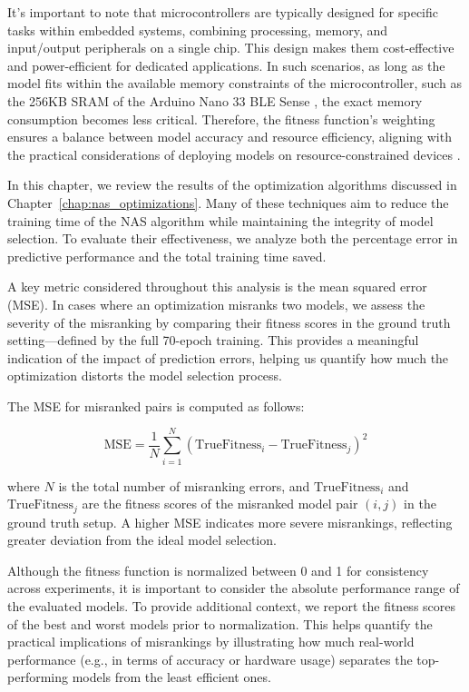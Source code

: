 It's important to note that microcontrollers are typically designed for specific tasks within embedded systems, combining processing, memory, and input/output peripherals on a single chip. This design makes them cost-effective and power-efficient for dedicated applications. In such scenarios, as long as the model fits within the available memory constraints of the microcontroller, such as the 256KB SRAM of the Arduino Nano 33 BLE Sense , the exact memory consumption becomes less critical. Therefore, the fitness function's weighting ensures a balance between model accuracy and resource efficiency, aligning with the practical considerations of deploying models on resource-constrained devices \cite{arduino_nano33ble}.

In this chapter, we review the results of the optimization algorithms discussed in Chapter~\ref{chap:nas_optimizations}. Many of these techniques aim to reduce the training time of the NAS algorithm while maintaining the integrity of model selection. To evaluate their effectiveness, we analyze both the percentage error in predictive performance and the total training time saved.

A key metric considered throughout this analysis is the mean squared error (MSE). In cases where an optimization misranks two models, we assess the severity of the misranking by comparing their fitness scores in the ground truth setting—defined by the full 70-epoch training. This provides a meaningful indication of the impact of prediction errors, helping us quantify how much the optimization distorts the model selection process.

The MSE for misranked pairs is computed as follows:

\begin{equation}
\text{MSE} = \frac{1}{N} \sum_{i=1}^{N} \left( \text{TrueFitness}_i - \text{TrueFitness}_j \right)^2
\end{equation}

where \( N \) is the total number of misranking errors, and \( \text{TrueFitness}_i \) and \( \text{TrueFitness}_j \) are the fitness scores of the misranked model pair \( (i, j) \) in the ground truth setup. A higher MSE indicates more severe misrankings, reflecting greater deviation from the ideal model selection.

Although the fitness function is normalized between 0 and 1 for consistency across experiments, it is important to consider the absolute performance range of the evaluated models. To provide additional context, we report the fitness scores of the best and worst models prior to normalization. This helps quantify the practical implications of misrankings by illustrating how much real-world performance (e.g., in terms of accuracy or hardware usage) separates the top-performing models from the least efficient ones.

